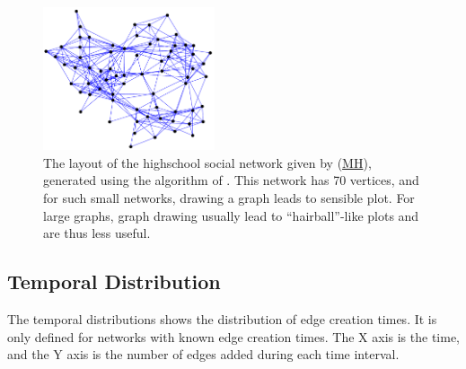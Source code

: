 \documentclass{article}
\newcommand{\wPlot}{0.45\textwidth}
\begin{document}
\begin{figure}
  \centering
  \includegraphics[width=\wPlot]{plot/layout.a.moreno_highschool}
  \caption{
    \label{fig:fruchterman-reingold}
    The layout of the highschool social network given by \cite{konect:coleman}
    (\href{http://konect.uni-koblenz.de/networks/moreno_highschool}{\textsf{MH}}),
    generated using the algorithm of \cite{b870}.  This network has 70 vertices,
    and for such small networks, drawing a graph leads to sensible
    plot.  For large graphs, graph drawing usually lead to
    ``hairball''-like plots and are thus less useful.
  }
\end{figure}

\subsection{Temporal Distribution}
The temporal distributions shows the distribution of edge creation
times.  It is only defined for networks with known edge creation times.
The X axis is the time, and the Y axis is the number of edges added
during each time interval.
\end{document}
